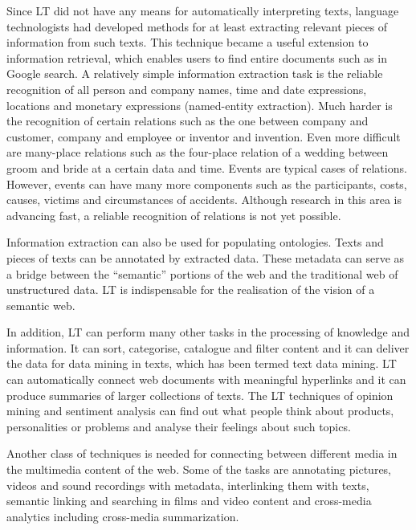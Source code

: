 \documentclass[10pt, plain]{../../metanetpaper}
\begin{document}
\begin{multicols}{2}
Since LT did not have any means for automatically interpreting texts, language technologists had developed methods for at least extracting relevant pieces of information from such texts. This technique became a useful extension to information retrieval, which enables users to find entire documents such as in Google search. A relatively simple information extraction task is the reliable recognition of all person and company names, time and date expressions, locations and monetary expressions (named-entity extraction). Much harder is the recognition of certain relations such as the one between company and customer, company and employee or inventor and invention. Even more difficult are many-place relations such as the four-place relation of a wedding between groom and bride at a certain data and time. Events are typical cases of relations. However, events can have many more components such as the participants, costs, causes, victims and circumstances of accidents. Although research in this area is advancing fast, a reliable recognition of relations is not yet possible.
 
Information extraction can also be used for populating ontologies. Texts and pieces of texts can be annotated by extracted data. These metadata can serve as a bridge between the ``semantic'' portions of the web and the traditional web of unstructured data. LT is indispensable for the realisation of the vision of a semantic web. 
 
In addition, LT can perform many other tasks in the processing of knowledge and information. It can sort, categorise, catalogue and filter content and it can deliver the data for data mining in texts, which has been termed text data mining. LT can automatically connect web documents with meaningful hyperlinks and it can produce summaries of larger collections of texts. The LT techniques of opinion mining and sentiment analysis can find out what people think about products, personalities or problems and analyse their feelings about such topics.

Another class of techniques is needed for connecting between different media in the multimedia content of the web. Some of the tasks are annotating pictures, videos and sound recordings with metadata, interlinking them with texts, semantic linking and searching in films and video content and cross-media analytics including cross-media summarization.
 

\end{multicols}
\end{document}
